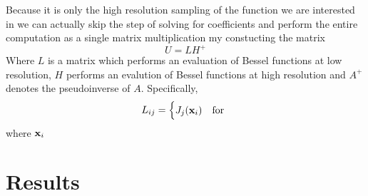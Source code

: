\documentclass{article}
\begin{document}
Because it is only the high resolution sampling of the function we are interested in we can actually skip the step of solving for coefficients and perform the entire computation as a single matrix multiplication my constucting the matrix
\[
U = L H^{+}
\]
Where $L$ is a matrix which performs an evaluation of Bessel functions at low resolution, $H$ performs an evalution of Bessel functions at high resolution and $A^{+}$ denotes the pseudoinverse of $A$. Specifically,
\[
L_{ij} =\begin{cases}
J_{j}({\bf x}_{i}) & \text{for } 
\end{cases}
\]
where ${\bf x}_{i}$ 

\section*{Results}
\end{document}

